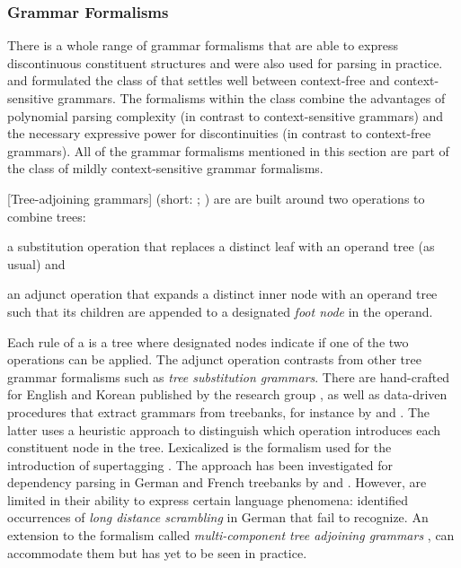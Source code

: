 \documentclass[../document.tex]{subfiles}
\begin{document}
    \subsubsection*{Grammar Formalisms}
    There is a whole range of grammar formalisms that are able to express discontinuous constituent structures and were also used for parsing in practice.
     and \citet{Weir88} formulated the class of  that settles well between context-free and context-sensitive grammars.
    The formalisms within the class combine the advantages of polynomial parsing complexity (in contrast to context-sensitive grammars) and the necessary expressive power for discontinuities (in contrast to context-free grammars).
    All of the grammar formalisms mentioned in this section are part of the class of mildly context-sensitive grammar formalisms.

    [Tree-adjoining grammars] (short: ; \citealp{JosLevTak75}) are are built around two operations to combine trees:
    \begin{compactitem}
        \item a substitution operation that replaces a distinct leaf with an operand tree (as usual) and
        \item an adjunct operation that expands a distinct inner node with an operand tree such that its children are appended to a designated \emph{foot node} in the operand.
    \end{compactitem}
    Each rule of a  is a tree where designated nodes indicate if one of the two operations can be applied.
    The adjunct operation contrasts  from other tree grammar formalisms such as \emph{tree substitution grammars}.
    There are hand-crafted  for English \citep{xtag01} and Korean \citep{xtag02} published by the  research group \citep{Doran99}, as well as data-driven procedures that extract grammars from treebanks, for instance by \citet{xia1999extracting} and \citet{Bla18}.
    The latter uses a heuristic approach to distinguish which operation introduces each constituent node in the tree.
    Lexicalized  is the formalism used for the introduction of supertagging \citep{bangalore1999supertagging}.
    The approach has been investigated for dependency parsing in German and French treebanks by \citet{Kas17} and \citet{Bla18}.
    However,  are limited in their ability to express certain language phenomena: \citet{Becker91} identified occurrences of \emph{long distance scrambling} in German that  fail to recognize.
    An extension to the formalism called \emph{multi-component tree adjoining grammars} \citep{VijWeiJos87,Weir88}, can accommodate them but has yet to be seen in practice.
\end{document}
